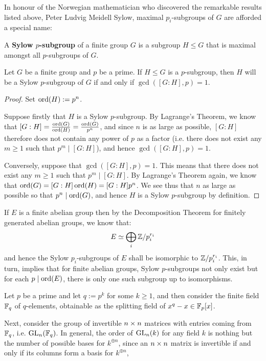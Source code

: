         In honour of the Norwegian mathematician who discovered the remarkable results listed above, Peter Ludvig Meidell Sylow, maximal $p_i$-subgroups of $G$ are afforded a special name:
        \begin{definition} \label{def: sylow_subgroups}
            A \textbf{Sylow $p$-subgroup} of a finite group $G$ is a subgroup $H \leq G$ that is maximal amongst all $p$-subgroups of $G$.
        \end{definition}
        \begin{lemma} \label{lemma: maximality_criterion_for_p_subgroups}
            Let $G$ be a finite group and $p$ be a prime. If $H \leq G$ is a $p$-subgroup, then $H$ will be a Sylow $p$-subgroup of $G$ if and only if $\gcd( [G : H], p ) = 1$. 
        \end{lemma}
            \begin{proof}
                Set $\operatorname{ord}(H) := p^n$.
            
                Suppose firstly that $H$ is a Sylow $p$-subgroup. By Lagrange's Theorem, we know that $[G : H] = \frac{\operatorname{ord}(G)}{\operatorname{ord}(H)} = \frac{\operatorname{ord}(G)}{p^n}$, and since $n$ is as large as possible, $[G : H]$ therefore does not contain any power of $p$ as a factor (i.e. there does not exist any $m \geq 1$ such that $p^m \mid [G : H]$), and hence $\gcd( [G : H], p ) = 1$.

                Conversely, suppose that $\gcd([G : H], p) = 1$. This means that there does not exist any $m \geq 1$ such that $p^m \mid [G : H]$. By Lagrange's Theorem again, we know that $\operatorname{ord}(G) = [G : H] \operatorname{ord}(H) = [G : H] p^n$. We see thus that $n$ as large as possible so that $p^n \mid \operatorname{ord}(G)$, and hence $H$ is a Sylow $p$-subgroup by definition. 
            \end{proof}
        \begin{example}
            If $E$ is a finite abelian group then by the Decomposition Theorem for finitely generated abelian groups, we know that:
                $$E \simeq \bigoplus_i \mathbb{Z}/p_i^{r_i}$$
            and hence the Sylow $p_i$-subgroups of $E$ shall be isomorphic to $\mathbb{Z}/p_i^{r_i}$. This, in turn, implies that for finite abelian groups, Sylow $p$-subgroups not only exist but for each $p \mid \operatorname{ord}(E)$, there is only one such subgroup up to isomorphisms.
        \end{example}
        \begin{example}
            Let $p$ be a prime and let $q := p^k$ for some $k \geq 1$, and then consider the finite field $\mathbb{F}_q$ of $q$-elements, obtainable as the splitting field of $x^q - x \in \mathbb{F}_p[x]$.

            Next, consider the group of invertible $n \x n$ matrices with entries coming from $\mathbb{F}_q$, i.e. $\mathrm{GL}_n(\mathbb{F}_q)$. In general, the order of $\mathrm{GL}_n(k)$ for any field $k$ is nothing but the number of possible bases for $k^{\oplus n}$, since an $n \x n$ matrix is invertible if and only if its columns form a basis for $k^{\oplus n}$, 
        \end{example}
